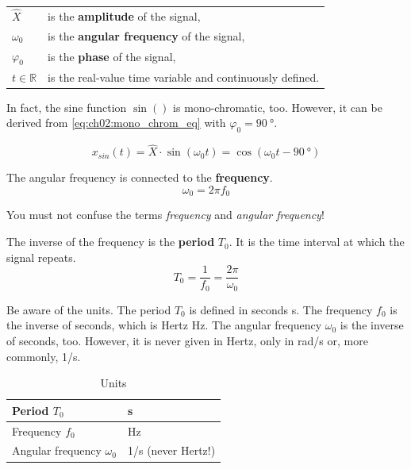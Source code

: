 \begin{refsection}
\begin{tabular}{ll}
	$\hat{X}$ & is the \index{amplitude} \textbf{amplitude} of the signal, \\
	$\omega_0$ & is the \index{angular frequency} \textbf{angular frequency} of the signal, \\
	$\varphi_0$ & is the \index{phase} \textbf{phase} of the signal, \\
	$t \in \mathbb{R}$ & is the real-value time variable and continuously defined.
\end{tabular}

In fact, the sine function $\sin()$ is mono-chromatic, too. However, it can be derived from \eqref{eq:ch02:mono_chrom_eq} with $\varphi_0 = \SI{90}{\degree}$.

\begin{equation*}
	x_{sin}(t) = \hat{X} \cdot \sin\left(\omega_0 t\right) = \cos\left(\omega_0 t - \SI{90}{\degree}\right)
\end{equation*}

The angular frequency is connected to the  \textbf{frequency}.
\begin{equation}
	\omega_0 = 2 \pi f_0
\end{equation}

\begin{attention}
	You must not confuse the terms \emph{frequency} and \emph{angular frequency}!
\end{attention}

The inverse of the frequency is the  \textbf{period} $T_0$. It is the time interval at which the signal repeats.
\begin{equation}
	T_0 = \frac{1}{f_0} = \frac{2 \pi}{\omega_0}
\end{equation}

Be aware of the units. The period $T_0$ is defined in seconds \si{s}. The frequency $f_0$ is the inverse of seconds, which is Hertz \si{Hz}. The angular frequency $\omega_0$ is the inverse of seconds, too. However, it is never given in Hertz, only in \si{rad/s} or, more commonly, \si{1/s}.

\begin{table}[H]
	\centering
	\caption{Units}
	\begin{tabular}{|l|l|}
		\hline
		Period $T_0$ & \si{s} \\
		\hline
		Frequency $f_0$ & \si{Hz} \\
		\hline
		Angular frequency $\omega_0$ & \si{1/s} \; (never Hertz!) \\
		\hline
	\end{tabular}
\end{table}


\end{refsection}
